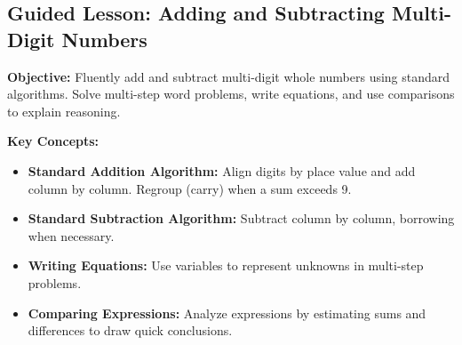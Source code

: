 \documentclass[12pt]{article}
\begin{document}
\subsection*{Guided Lesson: Adding and Subtracting Multi-Digit Numbers}
\onehalfspacing

\begin{tcolorbox}[colframe=black!40, colback=gray!5, 
coltitle=black, colbacktitle=black!20, fonttitle=\bfseries\Large, 
title=Learning Objective, halign title=center, left=5pt, right=5pt, top=5pt, bottom=15pt]
\textbf{Objective:} Fluently add and subtract multi-digit whole numbers using standard algorithms. Solve multi-step word problems, write equations, and use comparisons to explain reasoning.
\end{tcolorbox}

\begin{tcolorbox}[colframe=black!60, colback=white, 
coltitle=black, colbacktitle=black!15, fonttitle=\bfseries\Large, 
title=Key Concepts and Vocabulary, halign title=center, left=10pt, right=10pt, top=10pt, bottom=15pt]
\textbf{Key Concepts:}
\begin{itemize}
    \item \textbf{Standard Addition Algorithm:} Align digits by place value and add column by column. Regroup (carry) when a sum exceeds 9.
    \item \textbf{Standard Subtraction Algorithm:} Subtract column by column, borrowing when necessary.
    \item \textbf{Writing Equations:} Use variables to represent unknowns in multi-step problems.
    \item \textbf{Comparing Expressions:} Analyze expressions by estimating sums and differences to draw quick conclusions.
\end{itemize}
\end{tcolorbox}
\end{document}
